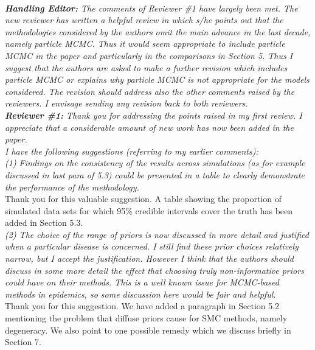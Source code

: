 \documentclass{article}
\begin{document}
 \\

\noindent \emph{{\bf Handling Editor:} The comments of Reviewer \#1 have largely been met.  The new reviewer has written a helpful review in which s/he points out that the methodologies considered by the authors omit the main advance in the last decade, namely particle MCMC.  Thus it would seem appropriate to include particle MCMC in the paper and particularly in the comparisons in Section 5.  Thus I suggest that the authors are asked to make a further revision which includes particle MCMC or explains why particle MCMC is not appropriate for the models considered.  The revision should address also the other comments raised by the reviewers.  I envisage sending any revision back to both reviewers.} \\

\noindent \emph{{\bf Reviewer \#1:} Thank you for addressing the points raised in my first review. I appreciate that a considerable amount of new work has now been added in the paper.} \\

\noindent \emph{I have the following suggestions (referring to my earlier comments):} \\

\noindent \emph{(1) Findings on the consistency of the results across simulations (as for example discussed in last para of 5.3) could be presented in a table to clearly demonstrate the performance of the methodology.} \\

Thank you for this valuable suggestion. A table showing the proportion of simulated data sets for which 95\% credible intervals cover the truth has been added in Section 5.3. \\

\noindent \emph{(2) The choice of the range of priors is now discussed in more detail and justified when a particular disease is concerned. I still find these prior choices relatively narrow, but I accept the justification. However I think that the authors should discuss in some more detail the effect that choosing truly non-informative priors could have on their methods. This is a well known issue for MCMC-based methods in epidemics, so some discussion here would be fair and helpful.} \\

Thank you for this suggestion. We have added a paragraph in Section 5.2 mentioning the problem that diffuse priors cause for SMC methods, namely degeneracy. We also point to one possible remedy which we discuss briefly in Section 7. \\
\end{document}
